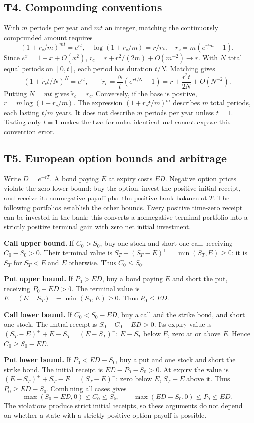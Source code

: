 \documentclass[11pt,a4paper]{article}
\begin{document}
\subsection{T4. Compounding conventions}
With $m$ periods per year and $mt$ an integer, matching the continuously compounded amount requires
\[
(1+r_c/m)^{mt}=e^{rt},\quad
\log(1+r_c/m)=r/m,\quad r_c=m(e^{r/m}-1).
\]
Since $e^x=1+x+O(x^2)$, $r_c=r+r^2/(2m)+O(m^{-2})\to r$.
With $N$ total equal periods on $[0,t]$, each period has duration $t/N$. Matching gives
\[
(1+\widetilde r_ct/N)^N=e^{rt},\qquad
\widetilde r_c=\frac Nt(e^{rt/N}-1)=r+\frac{r^2t}{2N}+O(N^{-2}).
\]
Putting $N=mt$ gives $\widetilde r_c=r_c$. Conversely, if the base is positive,
$r=m\log(1+r_c/m)$. The expression $(1+r_ct/m)^m$ describes $m$ total periods, each lasting $t/m$ years. It does not describe $m$ periods per year unless $t=1$. Testing only $t=1$ makes the two formulas identical and cannot expose this convention error.

\subsection{T5. European option bounds and arbitrage}
Write $D=e^{-rT}$. A bond paying $E$ at expiry costs $ED$. Negative option prices violate the zero lower bound: buy the option, invest the positive initial receipt, and receive its nonnegative payoff plus the positive bank balance at $T$. The following portfolios establish the other bounds. Every positive time-zero receipt can be invested in the bank; this converts a nonnegative terminal portfolio into a strictly positive terminal gain with zero net initial investment.

\textbf{Call upper bound.} If $C_0>S_0$, buy one stock and short one call, receiving $C_0-S_0>0$. Their terminal value is
$S_T-(S_T-E)^+=\min(S_T,E)\geq0$: it is $S_T$ for $S_T<E$ and $E$ otherwise. Thus $C_0\leq S_0$.

\textbf{Put upper bound.} If $P_0>ED$, buy a bond paying $E$ and short the put, receiving $P_0-ED>0$. The terminal value is
$E-(E-S_T)^+=\min(S_T,E)\geq0$. Thus $P_0\leq ED$.

\textbf{Call lower bound.} If $C_0<S_0-ED$, buy a call and the strike bond, and short one stock. The initial receipt is $S_0-C_0-ED>0$. Its expiry value is
$(S_T-E)^++E-S_T=(E-S_T)^+$: $E-S_T$ below $E$, zero at or above $E$. Hence $C_0\geq S_0-ED$.

\textbf{Put lower bound.} If $P_0<ED-S_0$, buy a put and one stock and short the strike bond. The initial receipt is $ED-P_0-S_0>0$. At expiry the value is
$(E-S_T)^++S_T-E=(S_T-E)^+$: zero below $E$, $S_T-E$ above it. Thus $P_0\geq ED-S_0$. Combining all cases gives
\[
\max(S_0-ED,0)\leq C_0\leq S_0,\qquad
\max(ED-S_0,0)\leq P_0\leq ED.
\]
The violations produce strict initial receipts, so these arguments do not depend on whether a state with a strictly positive option payoff is possible.
\end{document}
